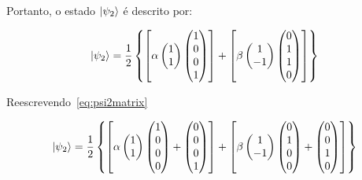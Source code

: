 Portanto, o estado $\ket{\psi_2}$ é descrito por:

\begin{align}\label{eq:psi2matrix}
\ket{\psi_2} = \frac{1}{2} \left\{\left[ \alpha \begin{pmatrix}
1 \\
1 
\end{pmatrix} \begin{pmatrix}
1 \\
0 \\
0 \\
1
\end{pmatrix}\right] + \left[\beta \begin{pmatrix}
1 \\
-1
\end{pmatrix} \begin{pmatrix}
0 \\
1 \\
1 \\
0
\end{pmatrix}\right]\right\}
\end{align}

Reescrevendo~\eqref{eq:psi2matrix}

\begin{equation}\label{eq:psi2aberto}
\ket{\psi_2} = \frac{1}{2} \left\{\left[ \alpha \begin{pmatrix}
1 \\
1 
\end{pmatrix} \begin{pmatrix}
1 \\
0 \\
0 \\
0
\end{pmatrix} +\begin{pmatrix}
0 \\
0 \\
0 \\
1
\end{pmatrix} \right] + \left[\beta \begin{pmatrix}
1 \\
-1
\end{pmatrix} \begin{pmatrix}
0 \\
1 \\
0 \\
0
\end{pmatrix} + \begin{pmatrix}
0 \\
0 \\
1 \\
0
\end{pmatrix}\right]\right\}
\end{equation}

